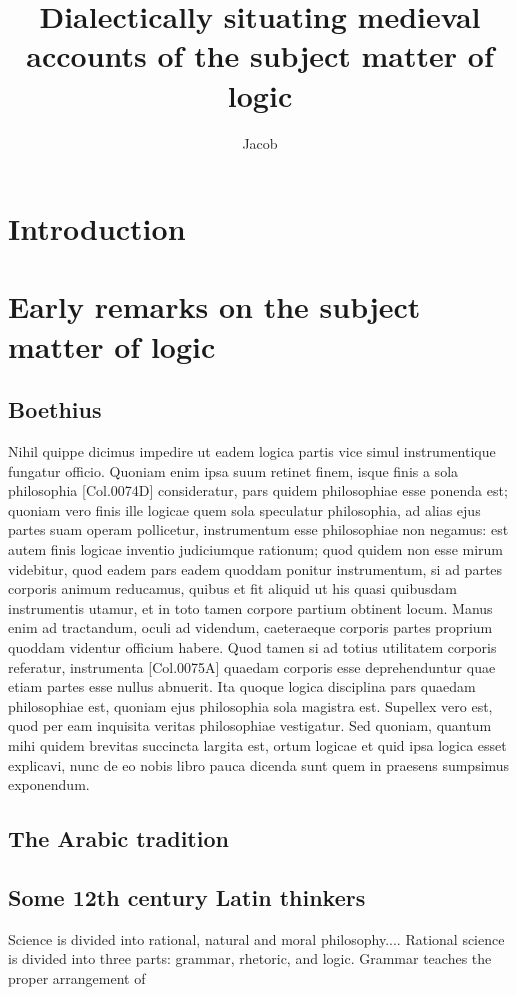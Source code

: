 \documentclass[]{article}
\title{Dialectically situating medieval accounts of the subject matter of logic}
\author{Jacob}
\begin{document}
\maketitle

\begin{abstract}

\end{abstract}

\section{Introduction}
\section{Early remarks on the subject matter of logic}
\subsection{Boethius}
Nihil quippe dicimus impedire ut eadem logica partis vice simul instrumentique fungatur officio. Quoniam enim ipsa suum retinet finem, isque finis a sola philosophia [Col.0074D] consideratur, pars quidem philosophiae esse ponenda est; quoniam vero finis ille logicae quem sola speculatur philosophia, ad alias ejus partes suam operam pollicetur, instrumentum esse philosophiae non negamus: est autem finis logicae inventio judiciumque rationum; quod quidem non esse mirum videbitur, quod eadem pars eadem quoddam ponitur instrumentum, si ad partes corporis animum reducamus, quibus et fit aliquid ut his quasi quibusdam instrumentis utamur, et in toto tamen corpore partium obtinent locum. Manus enim ad tractandum, oculi ad videndum, caeteraeque corporis partes proprium quoddam videntur officium habere. Quod tamen si ad totius utilitatem corporis referatur, instrumenta [Col.0075A] quaedam corporis esse deprehenduntur quae etiam partes esse nullus abnuerit. Ita quoque logica disciplina pars quaedam philosophiae est, quoniam ejus philosophia sola magistra est. Supellex vero est, quod per eam inquisita veritas philosophiae vestigatur. Sed quoniam, quantum mihi quidem brevitas succincta largita est, ortum logicae et quid ipsa logica esset explicavi, nunc de eo nobis libro pauca dicenda sunt quem in praesens sumpsimus exponendum.
\subsection{The Arabic tradition}
\subsection{Some 12th century Latin thinkers}
Science is divided into rational, natural and moral philosophy.... Rational science is divided into three parts: grammar, rhetoric, and logic. Grammar teaches the proper arrangement of 
\end{document}
